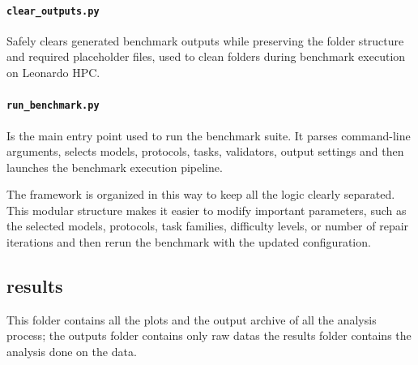 \paragraph{\texttt{clear_outputs.py}}
Safely clears generated benchmark outputs while preserving the folder structure and required placeholder files, used to clean folders during benchmark execution on Leonardo HPC.

\paragraph{\texttt{run_benchmark.py}}
Is the main entry point used to run the benchmark suite. It parses command-line arguments, selects models, protocols, tasks, validators, output settings and then launches the benchmark execution pipeline.

The framework is organized in this way to keep all the logic clearly separated. This modular structure makes it easier to modify important parameters, such as the selected models, protocols, task families, difficulty levels, or number of repair iterations and then rerun the benchmark with the updated configuration.

\subsection{results}
This folder contains all the plots and the output archive of all the analysis process; the outputs folder contains only raw datas the results folder contains the analysis done on the data. 